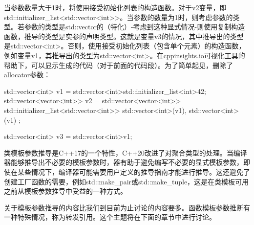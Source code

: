 当参数数量大于1时，将使用接受初始化列表的构造函数。对于v2变量，即std::initializer_list<std::vector<int>>。当参数的数量为1时，则考虑参数的类型。若参数的类型是std::vector的（特化）-考虑到这种显式情况-则使用复制构造函数，推导的类型是实参的声明类型。这就是变量v3的情况，其中推导出的类型是std::vector<int>。否则，使用接受初始化列表（包含单个元素）的构造函数，例如变量v1，其推导出的类型为std::vector<int>。在cppinsights.io可视化工具的帮助下，可以显示生成的代码（对于前面的代码段）。为了简单起见，删除了allocator参数：

\begin{cppcode}
std::vector<int> v1 =
std::vector<int>{std::initializer_list<int>{42}};
std::vector<vector<int>> v2 =
std::vector<vector<int>>{
	std::initializer_list<std::vector<int>>{
		std::vector<int>(v1),
			std::vector<int>(v1)
		}
	};

std::vector<int> v3 = std::vector<int>{v1};
\end{cppcode}

类模板参数推导是C++17的一个特性，C++20改进了对聚合类型的处理。当编译器能够推导出不必要的模板参数时，器有助于避免编写不必要的显式模板参数，即使在某些情况下，编译器可能需要用户定义的推导指南才能进行推导。这还避免了创建工厂函数的需要，例如std::make_pair或std::make_tuple，这是在类模板可用之前从模板参数推导中受益的一种方式。

关于模板参数推导的内容比我们到目前为止讨论的内容要多。函数模板参数推断有一种特殊情况，称为转发引用。这个主题将在下面的章节中进行讨论。







